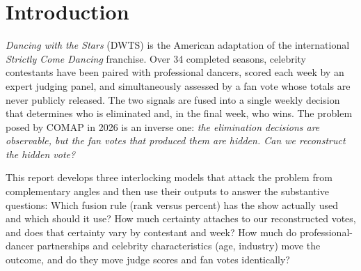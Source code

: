 \documentclass{article}
\begin{document}
\begin{abstract}
fusion better serves a pure excitement objective. An extended analysis adds a
\textbf{non-circular benchmark}: using judge scores alone, the couple with the lowest judge
share is the one actually eliminated in only $\mathbf{44.4\%}$ of the 266 eliminating weeks,
and in only $42.2\%$ of eliminations does the eliminated couple hold the worst judge rank ---
so an audience channel (or, later, the judge save) is necessary in \emph{every} regime. Rank
and percent fusion would eliminate different couples in \textbf{24 of 266} weeks ($9.02\%$),
and a sharp discontinuity in hit rate ($1.000\rightarrow0.371$) and Brier score
($0.011\rightarrow0.567$) between seasons 27 and 28 identifies the rule change empirically
instead of assuming it. A counterfactual fusion-weight scan and an interval-robust replay
delimit which conclusions are identified and which remain structurally circular. All
\textbf{18 figures}, eight generated tables and the full estimation pipeline are reproducible
from the provided CSV artifacts.

\vspace{0.5em}
\noindent\textbf{Keywords:} inverse voting problem, constrained polytope reconstruction,
hit-and-run sampling, Plackett--Luce, hierarchical mixed effects, rank vs.\ percent fusion,
Dancing with the Stars.
\end{abstract}

\newpage

\tableofcontents
\newpage

\section{Introduction}

\emph{Dancing with the Stars} (DWTS) is the American adaptation of the international
\emph{Strictly Come Dancing} franchise. Over 34 completed seasons, celebrity contestants
have been paired with professional dancers, scored each week by an expert judging panel,
and simultaneously assessed by a fan vote whose totals are never publicly released. The
two signals are fused into a single weekly decision that determines who is eliminated
and, in the final week, who wins. The problem posed by COMAP in 2026 is an inverse one:
\emph{the elimination decisions are observable, but the fan votes that produced them are
hidden. Can we reconstruct the hidden vote?}

This report develops three interlocking models that attack the problem from complementary
angles and then use their outputs to answer the substantive questions: Which fusion rule
(rank versus percent) has the show actually used and which should it use? How much
certainty attaches to our reconstructed votes, and does that certainty vary by contestant
and week? How much do professional-dancer partnerships and celebrity characteristics
(age, industry) move the outcome, and do they move judge scores and fan votes identically?
\end{document}
